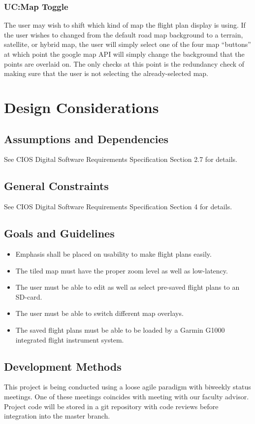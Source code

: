 \documentclass[12pt, letterpaper]{article}
\begin{document}
\clearpage
\subsubsection{UC:Map Toggle}
The user may wish to shift which kind of map the flight plan display is using.
If the user wishes to changed from the default road map background to a terrain, satellite, or hybrid map, the user will simply select one of the four map “buttons” at which point the google map API will simply change the background that the points are overlaid on.
The only checks at this point is the redundancy check of making sure that the user is not selecting the already-selected map.

\clearpage
\section{Design Considerations} \label{dsign}
  \subsection{Assumptions and Dependencies}
    See CIOS Digital Software Requirements Specification Section 2.7 for details.
  \subsection{General Constraints}
    See CIOS Digital Software Requirements Specification Section 4 for details.
  \subsection{Goals and Guidelines}
    \begin{itemize}
      \setlength{\itemsep}{1pt}
      \setlength{\parskip}{0pt}
      \setlength{\parsep}{0pt}
      \item Emphasis shall be placed on usability to make flight plans easily.
      \item The tiled map must have the proper zoom level as well as low-latency.
      \item The user must be able to edit as well as select pre-saved flight plans to an SD-card.
      \item The user must be able to switch different map overlays.
      \item The saved flight plans must be able to be loaded by a Garmin G1000 integrated flight instrument system.
    \end{itemize}
  \subsection{Development Methods}
    This project is being conducted using a loose agile paradigm with biweekly status meetings.
    One of these meetings coincides with meeting with our faculty advisor.
    Project code will be stored in a git repository with code reviews before integration into the master branch.
\end{document}
